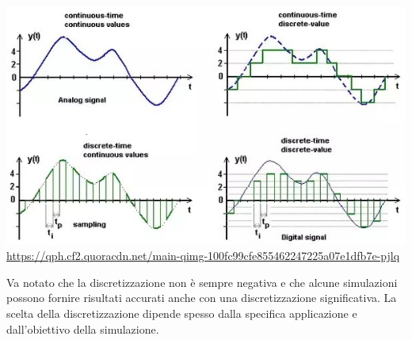 \begin{minipage}{\linewidth}
    \centering
    \includegraphics[scale=0.5]{img/main-qimg-100fc99cfe855462247225a07e1dfb7e-pjlq.jpg}
    \url{https://qph.cf2.quoracdn.net/main-qimg-100fc99cfe855462247225a07e1dfb7e-pjlq}
    \label{fig:discretization}
\end{minipage}

Va notato che la discretizzazione non è sempre negativa e che alcune 
simulazioni possono fornire risultati accurati anche con una 
discretizzazione significativa. La scelta della discretizzazione 
dipende spesso dalla specifica applicazione e dall'obiettivo della simulazione.